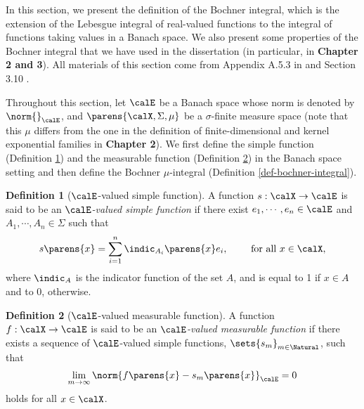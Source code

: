 \documentclass[12pt]{article}
\theoremstyle{definition}
\newtheorem{definition}{Definition}
\theoremstyle{theorem}
\theoremstyle{remark}
\begin{document}
In this section, we present the definition of the Bochner integral, which is the extension of the Lebesgue integral of real-valued functions to the integral of functions taking values in a Banach space. We also present some properties of the Bochner integral that we have used in the dissertation (in particular, in \textbf{\color{red} Chapter 2 and 3}). All materials of this section come from Appendix A.5.3 in \textcite{Steinwart2008-tn} and Section 3.10 \textcite{Denkowski2013-ke}. 

Throughout this section, let $\calE$ be a Banach space whose norm is denoted by $\norm{}_{\calE}$, and $\parens{\calX, \Sigma, \mu}$ be a $\sigma$-finite measure space (note that this $\mu$ differs from the one in the definition of finite-dimensional and kernel exponential families in \textbf{\color{red} Chapter 2}). We first define the simple function (Definition \ref{def-simple-fun}) and the measurable function (Definition \ref{def-measurable-fun}) in the Banach space setting  and then define the Bochner $\mu$-integral (Definition \ref{def-bochner-integral}). 

\begin{definition}[$\calE$-valued simple function]\label{def-simple-fun}
	A function $s: \calX \to \calE$ is said to be an \textit{$\calE$-valued simple function} if there exist $e_1, \cdots, e_n \in \calE$ and $A_1, \cdots, A_n \in \Sigma$ such that 
	\begin{align*}
		s \parens{x} = \sum_{i=1}^n \indic_{A_i} \parens{x} e_i, \qquad \text{ for all } x \in \calX, 
	\end{align*}
	where $\indic_A$ is the indicator function of the set $A$, and is equal to 1 if $x \in A$ and to 0, otherwise. 
\end{definition}

\begin{definition}[$\calE$-valued measurable function]\label{def-measurable-fun}
	A function $f: \calX \to \calE$ is said to be an \textit{$\calE$-valued measurable function} if there exists a sequence of $\calE$-valued simple functions, $\sets{s_m}_{m \in \Natural}$, such that
	\begin{align}
		\lim_{m \to \infty} \norm{f \parens{x} - s_m \parens{x}}_{\calE} = 0
	\end{align}
	holds for all $x \in \calX$. 
\end{definition}
\end{document}
